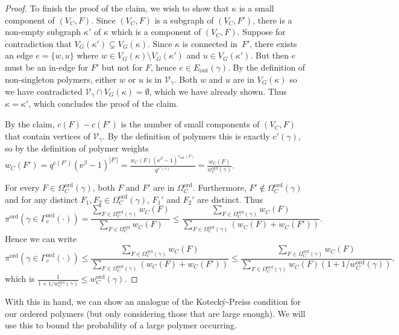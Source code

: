 \documentclass[11pt]{article}
\theoremstyle{plain}
\newcommand{\emm}{\mathrm{e}}
\newcommand{\V}{\mathcal{V}}
\newcommand{\Vin}{\V_\gamma}
\newcommand{\out}{\mathrm{out}}
\newcommand{\1}{\mathbb{1}}
\newcommand{\ord}{\mathrm{ord}}
\begin{document}
\begin{proof}
To finish the proof of the claim, we wish to show that $\kappa$ is a small component of $(V_C,F)$.
Since \((V_C,F)\) is a subgraph of \((V_C,F')\), there is a non-empty subgraph 
\(\kappa'\) of \(\kappa\) which is a component of \((V_C,F)\).  Suppose for contradiction that \(V_G(\kappa')\subsetneq V_G(\kappa)\). Since \(\kappa\) is connected in~$F'$, there exists an edge \(e = \{w, u\}\) where \(w\in V_G(\kappa)\setminus V_G(\kappa')\) and \(u\in V_G(\kappa')\). But then \(e\) must be an in-edge for \(F'\) but not for \(F\), hence \(e\in E_\out(\gamma)\). By the definition of non-singleton polymers, either \(w\) or \(u\) is in \(\Vin\). Both $w$ and $u$ are in $V_G(\kappa)$ so we have contradicted
\(\Vin\cap V_G(\kappa) = \emptyset\), which we have already shown.
Thus \(\kappa = \kappa'\), which concludes the proof of the claim.

By the claim,
\(c(F) - c(F')\) is the number of small components of \((V_C,F)\) that contain vertices of \(\Vin\). By the definition of polymers this is exactly \(c'(\gamma)\), so by the definition of polymer weights 
\(w_C(F') 
= q^{c(F')}(\emm^\beta-1)^{|F'|}
= \frac{w_C(F)(\emm^\beta-1)^{e_\out(F)}}{q^{c'(\gamma)} } = \frac{w_C(F)}{w_C^\ord(\gamma)}\). 

For every $F\in \Omega^\ord_C(\gamma)$, both $F$ and $F'$ are in $\Omega^\ord_C$.  
Furthermore, $F' \notin \Omega^\ord_C(\gamma)$
and for any distinct $F_1,F_2 \in 
\Omega^\ord_C(\gamma)$,
$F_1'$ and $F_2'$ are distinct.
Thus
 \[  \pi^\ord(\gamma\in\Gamma_v^\ord(\cdot)) = \frac{\sum_{F\in \Omega_C^{\ord}(\gamma)} w_C(F)}{\sum_{F\in\Omega^\ord_C} w_C(F)}
 \leq
\frac{\sum_{F\in \Omega_C^{\ord}(\gamma)} w_C(F)}{\sum_{F\in\Omega^\ord_C(\gamma)} (w_C(F) + w_C(F'))}.
    \]
Hence we can write
    \[
    \pi^\ord(\gamma\in\Gamma_v^\ord(\cdot))  \leq \frac{\sum_{F\in \Omega_C^{\ord}(\gamma)} w_C(F)}{\sum_{F\in \Omega_C^{\ord}(\gamma)} (w_C(F) + w_C(F'))} \leq \frac{\sum_{F\in \Omega_C^{\ord}(\gamma)} w_C(F)}{\sum_{F\in \Omega_C^{\ord}(\gamma)} w_C(F)(1 + 1/w^\ord_C(\gamma))},
    \]
    which is \(\frac{1}{1+1/w^\ord_C(\gamma)}\leq w^\ord_C(\gamma)\).
\end{proof}

With this in hand, we can show an analogue of the Koteck\'y-Preiss condition for our ordered polymers (but only considering those that are large enough).
We will use this to   bound the probability of a large polymer occurring.
\end{document}
